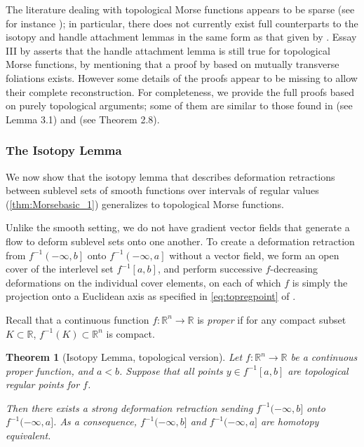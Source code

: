 \documentclass[11pt]{article}
\newcommand{\R}{\mathbb{R}}
\newcommand{\sublevel}[2]{{#1}^{-1}\left(-\infty, {#2}\right]}
\newcommand{\intlevel}[3]{{#1}^{-1}\left[{#2}, {#3}\right]}
\theoremstyle{plain}
\newtheorem{thm}{Theorem}
\theoremstyle{definition}
\theoremstyle{remark}
\begin{document}
The literature dealing with topological Morse functions appears to be sparse (see for instance \cite{cantwell_topological_1968,morse_f_1973,landis_tractions_1975}); in particular, there does not currently exist full counterparts to the isotopy and handle attachment lemmas in the same form as that given by \cite{milnor_morse_1963}. Essay III by \cite{kirby_foundational_1977} asserts that the handle attachment lemma is still true for topological Morse functions, by mentioning that a proof by \cite{siebenmann_deformation_1972} based on mutually transverse foliations exists. However some details of the proofs appear to be missing to allow their complete reconstruction.
For completeness, we provide the full proofs based on purely topological arguments; some of them are similar to those found in \cite{cantwell_topological_1968} (see Lemma 3.1) and \cite{corvellec_deformation_1993} (see Theorem 2.8).

\subsubsection{The Isotopy Lemma}

We now show that the isotopy lemma that describes deformation retractions between sublevel sets of smooth functions over intervals of regular values  (\ref{thm:Morsebasic_1}) generalizes to topological Morse functions. 

Unlike the smooth setting, we do not have gradient vector fields that generate a flow to deform sublevel sets onto one another. To create a deformation retraction from $\sublevel{f}{b}$ onto $\sublevel{f}{a}$ without a vector field, we form an open cover of the interlevel set $\intlevel{f}{a}{b}$, and perform successive $f$-decreasing deformations on the individual cover elements, on each of which $f$ is simply the projection onto a Euclidean axis as specified in \cref{eq:topregpoint} of . 

Recall that a continuous function $f : \R^n \to \R$ is \emph{proper} if for any compact subset $K \subset \R$, $f^{-1}(K) \subset \R^n$ is compact.
\begin{thm}[Isotopy Lemma, topological version]
	\label{thm:topological_isotopy_lemma}
Let $f : \R^n \to \R$ be a continuous proper function, and $a < b$. Suppose that all points $y \in f^{-1}[a,b]$ are topological regular points for $f$.

Then there exists a strong deformation retraction sending $f^{-1}(-\infty, b]$ onto $f^{-1}(-\infty, a]$. As a consequence, $f^{-1}(-\infty, b]$ and $f^{-1}(-\infty, a]$ are homotopy equivalent.
\end{thm}
\end{document}
